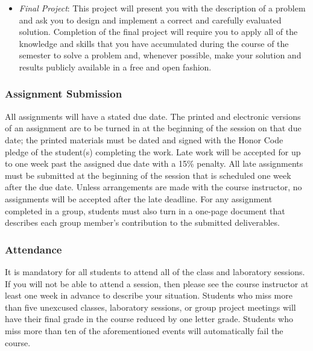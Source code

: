 \begin{itemize}
  \item {\em Final Project\/}: This project will present you with the description of a problem and ask you to design
    and implement a correct and carefully evaluated solution. Completion of the final project will require you to
    apply all of the knowledge and skills that you have accumulated during the course of the semester to solve a
    problem and, whenever possible, make your solution and results publicly available in a free and open fashion.

\end{itemize}

\subsubsection*{Assignment Submission}

All assignments will have a stated due date. The printed and electronic versions of an assignment are to be turned in at
the beginning of the session on that due date; the printed materials must be dated and signed with the Honor Code pledge
of the student(s) completing the work.  Late work will be accepted for up to one week past the assigned due date with a
15\% penalty. All late assignments must be submitted at the beginning of the session that is scheduled one week after
the due date. Unless arrangements are made with the course instructor, no assignments will be accepted after the late
deadline. For any assignment completed in a group, students must also turn in a one-page document that describes each
group member's contribution to the submitted deliverables.

\subsubsection*{Attendance}

It is mandatory for all students to attend all of the class and laboratory sessions. If you will not be able to attend a
session, then please see the course instructor at least one week in advance to describe your situation.  Students who
miss more than five unexcused classes, laboratory sessions, or group project meetings will have their final grade in the
course reduced by one letter grade. Students who miss more than ten of the aforementioned events will automatically fail
the course.

%
%

